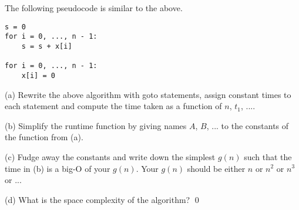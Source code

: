 The following pseudocode is similar to the above.
\begin{Verbatim}[frame=single, fontsize=\small]
s = 0
for i = 0, ..., n - 1:
    s = s + x[i]

for i = 0, ..., n - 1:
    x[i] = 0
\end{Verbatim}
(a) Rewrite the above algorithm with
goto statements, assign constant times to each statement and 
compute the time taken as a function of $n$, $t_1$, ....

(b) Simplify the runtime function by giving names $A$, $B$, ...
to the constants of the function from (a).

(c) Fudge away the constants and write down the simplest $g(n)$ such 
that the time in (b) is a big-O of your $g(n)$.
Your $g(n)$ should be either $n$ or $n^2$ or $n^3$ or ...

(d) What is the space complexity of the algorithm?
\qed
